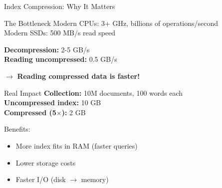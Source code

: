 \documentclass[aspectratio=169]{beamer}
\newif\ifanimated
\newcommand{\cpause}{\ifanimated\pause\fi}
\begin{document}
\begin{frame}[shrink=10]{Index Compression: Why It Matters}
\begin{block}{The Bottleneck}
Modern CPUs: 3+ GHz, billions of operations/second \\
Modern SSDs: 500 MB/s read speed

\vspace{0.5em}

\textbf{Decompression:} 2-5 GB/s \\
\textbf{Reading uncompressed:} 0.5 GB/s

\vspace{0.5em}

$\rightarrow$ \textbf{Reading compressed data is faster!}
\end{block}
\cpause

\vspace{1em}

\begin{exampleblock}{Real Impact}
\textbf{Collection:} 10M documents, 100 words each \\
\textbf{Uncompressed index:} 10 GB \\
\textbf{Compressed (5$\times$):} 2 GB

\vspace{0.5em}

Benefits:
\begin{itemize}
    \item More index fits in RAM (faster queries)
    \item Lower storage costs
    \item Faster I/O (disk $\rightarrow$ memory)
\end{itemize}
\end{exampleblock}
\cpause
\end{frame}
\end{document}
